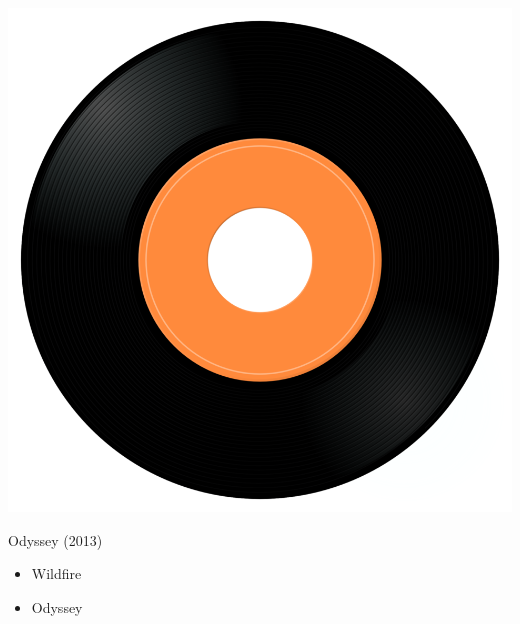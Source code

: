 \begin{minipage}[t]{0.25\textwidth}\vspace{0pt}
\captionsetup{type=figure}
\includegraphics[width=\textwidth]{Images/cover.png}
\caption*{Odyssey (2013)}
\end{minipage}
\begin{minipage}[t]{0.25\textwidth}\vspace{0pt}
\begin{itemize}[nosep,leftmargin=1em,labelwidth=*,align=left]
	\setlength{\itemsep}{0pt}
	\item Wildfire
	\item Odyssey
\end{itemize}
\end{minipage}
